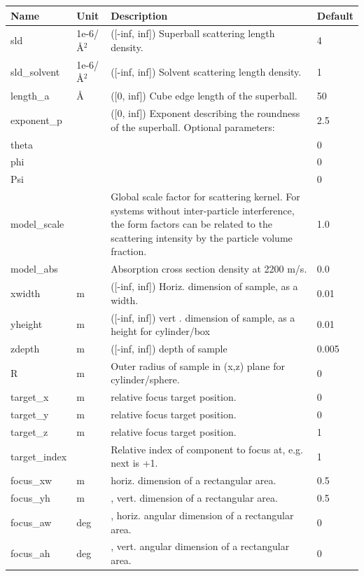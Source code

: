 \begin{longtable}{p{}p{}p{}p{}}
\toprule
\textbf{Name} & \textbf{Unit} & \textbf{Description} & \textbf{Default} \\
\midrule
\endhead
sld & 1e-6/\AA{}$^{2}$ & ([-inf, inf]) Superball scattering length density. & 4 \\
sld\_solvent & 1e-6/\AA{}$^{2}$ & ([-inf, inf]) Solvent scattering length density. & 1 \\
length\_a & \AA{} & ([0, inf]) Cube edge length of the superball. & 50 \\
exponent\_p &  & ([0, inf]) Exponent describing the roundness of the superball. Optional parameters: & 2.5 \\
theta &  &  & 0 \\
phi &  &  & 0 \\
Psi &  &  & 0 \\
model\_scale &   & Global scale factor for scattering kernel. For systems without inter-particle interference, the form factors can be related to the scattering intensity by the particle volume fraction. & 1.0 \\
model\_abs &   & Absorption cross section density at 2200 m/s. & 0.0 \\
xwidth & m & ([-inf, inf]) Horiz. dimension of sample, as a width. & 0.01 \\
yheight & m & ([-inf, inf]) vert . dimension of sample, as a height for cylinder/box & 0.01 \\
zdepth & m & ([-inf, inf]) depth of sample & 0.005 \\
R & m & Outer radius of sample in (x,z) plane for cylinder/sphere. & 0 \\
target\_x & m & relative focus target position. & 0 \\
target\_y & m & relative focus target position. & 0 \\
target\_z & m & relative focus target position. & 1 \\
target\_index &   & Relative index of component to focus at, e.g. next is +1. & 1 \\
focus\_xw & m & horiz. dimension of a rectangular area. & 0.5 \\
focus\_yh & m & , vert. dimension of a rectangular area. & 0.5 \\
focus\_aw & deg & , horiz. angular dimension of a rectangular area. & 0 \\
focus\_ah & deg & , vert. angular dimension of a rectangular area. & 0 \\

\end{longtable}
